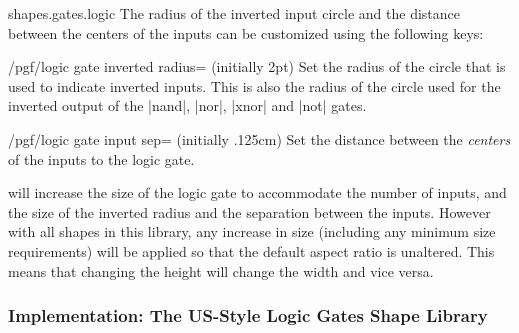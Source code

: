 \begin{pgflibrary}{shapes.gates.logic}
    The radius of the inverted input circle and the distance between the
    centers of the inputs can be customized using the following keys:

    \begin{key}{/pgf/logic gate inverted radius= (initially 2pt)}
        Set the radius of the circle that is used to indicate inverted inputs.
        This is also the radius of the circle used for the inverted output of
        the |nand|, |nor|, |xnor| and |not| gates.
\begin{codeexample}[]
\end{codeexample}
    \end{key}

    \begin{key}{/pgf/logic gate input sep= (initially .125cm)}
        Set the distance between the \emph{centers} of the inputs to the logic
        gate.
\begin{codeexample}[]
\end{codeexample}
    \end{key}

    \pgfname{} will increase the size of the logic gate to accommodate the
    number of inputs, and the size of the inverted radius and the separation
    between the inputs. However with all shapes in this library, any increase
    in size (including any minimum size requirements) will be applied so that
    the default aspect ratio is unaltered. This means that changing the height
    will change the width and vice versa.
\end{pgflibrary}


\subsubsection{Implementation: The US-Style Logic Gates Shape Library}

